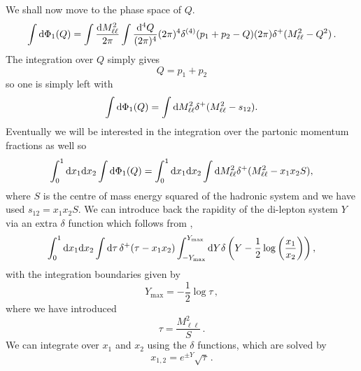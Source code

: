 \documentclass[a4paper,11pt]{article}
\begin{document}
We shall now move to the phase space of $Q$.
\begin{equation}
\int \mathrm d \Phi_1(Q) = 
\int \frac{\mathrm d M^2_{\ell\ell}}{2\pi} \int\frac{\mathrm d^4 Q}{(2\pi)^4} (2\pi)^4\delta^{(4)}(p_1 + p_2 -Q) (2\pi)\delta^+(M^2_{\ell\ell}-Q^2)\,.
\end{equation}
The integration over $Q$ simply gives
\begin{equation}
\label{eq:Qmomentum}
Q = p_1 + p_2
\end{equation}
so one is simply left with
\begin{equation}
\int \mathrm d \Phi_1 (Q) = 
\int \mathrm d M^2_{\ell\ell} \delta^+(M^2_{\ell\ell}-s_{12}).
\end{equation}
Eventually we will be interested in the integration over the partonic
momentum fractions as well so 
\begin{equation}
\int^1_0 \mathrm d x_1 \mathrm d x_2 \int \mathrm d \Phi_1 (Q) = 
\int^1_0 \mathrm d x_1 \mathrm d x_2 
\int \mathrm d M^2_{\ell\ell} \delta^+(M^2_{\ell\ell}-x_1 x_2 S),
\end{equation}
where $S$ is the centre of mass energy squared of the hadronic system and we
have used $s_{12} = x_1 x_2 S$.
We can introduce back the rapidity of the di-lepton system $Y$ via an extra
$\delta$ function which follows from ,
\begin{equation}
\int^1_0 \mathrm d x_1 \mathrm d x_2 
\int \mathrm d \tau \, \delta^+(\tau - x_1 x_2)
\int^{Y_{\max}}_{-Y_{\max}} \mathrm d Y \delta\left(Y- \frac{1}{2}\log\left(\frac{x_1}{x_2}\right)\right),
\end{equation}
with the integration boundaries given by
\begin{equation}
\label{eq:maxrapidity}
Y_{\max} = -\frac{1}{2} \log\tau\, ,
\end{equation}
where we have introduced
\begin{equation}
\tau = \frac{M^2_{\ell\ell}}{S}\,.
\end{equation}
We can integrate over $x_1$ and $x_2$ using the $\delta$ functions,
which are solved by
\begin{equation}
x_{1,2} = e^{\pm Y} \sqrt{\tau}\, .
\end{equation}
\end{document}
